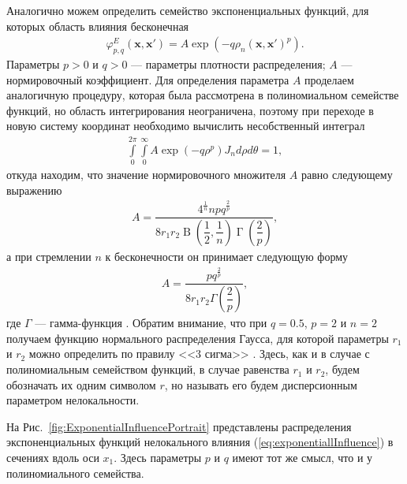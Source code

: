 Аналогично можем определить семейство экспоненциальных функций, для которых область влияния бесконечная
\begin{gather}
	\label{eq:exponentiallInfluence}
	\varphi_{p,q}^{E} (\boldsymbol{x}, \boldsymbol{x}') =
	A \exp \left(-q\rho_n(\boldsymbol{x}, \boldsymbol{x}')^p \right).
\end{gather}
Параметры $p > 0$ и $q > 0$ --- параметры плотности распределения; $A$ --- нормировочный коэффициент. Для определения параметра $A$ проделаем аналогичную процедуру, которая была рассмотрена в полиномиальном семействе функций, но область интегрирования неограничена, поэтому при переходе в новую систему координат необходимо вычислить несобственный интеграл
\begin{gather*}
	\int\limits_0^{2\pi}
		\int\limits_0^{\infty}
			A \exp \left(-q\rho^p \right) J_n
		d \rho
	d \theta = 1,
\end{gather*}
откуда находим, что значение нормировочного множителя $A$ равно следующему выражению
\begin{gather*}
	\label{eq:normExp}
	A = 
	\dfrac
	{
		4^{\frac{1}{n}} n p q^{\frac{2}{p}}
	}
	{
		8 r_1 r_2 \operatorname{B} \left( \dfrac{1}{2}, \dfrac{1}{n} \right) \operatorname{\Gamma} \left( \dfrac{2}{p} \right)
	},
\end{gather*}
а при стремлении $n$ к бесконечности он принимает следующую форму
\begin{gather*}
	A = \dfrac{p q^{\frac{2}{p}}}{8 r_1 r_2 \Gamma \left( \dfrac{2}{p} \right)},
\end{gather*}
где $\Gamma$ --- гамма-функция \cite{SpecialFunction}. Обратим внимание, что при $q = 0.5$, $p = 2$ и $n = 2$ получаем функцию нормального распределения Гаусса, для которой параметры $r_1$ и $r_2$ можно определить по правилу <<3 сигма>> \cite{TeorVer}. Здесь, как и в случае с полиномиальным семейством функций, в случае равенства $r_1$ и $r_2$, будем обозначать их одним символом $r$, но называть его будем дисперсионным параметром нелокальности.

На Рис.~\ref{fig:ExponentialInfluencePortrait} представлены распределения экспоненциальных функций нелокального влияния (\ref{eq:exponentiallInfluence}) в сечениях вдоль оси $x_1$. Здесь параметры $p$ и $q$ имеют тот же смысл, что и у полиномиального семейства.

